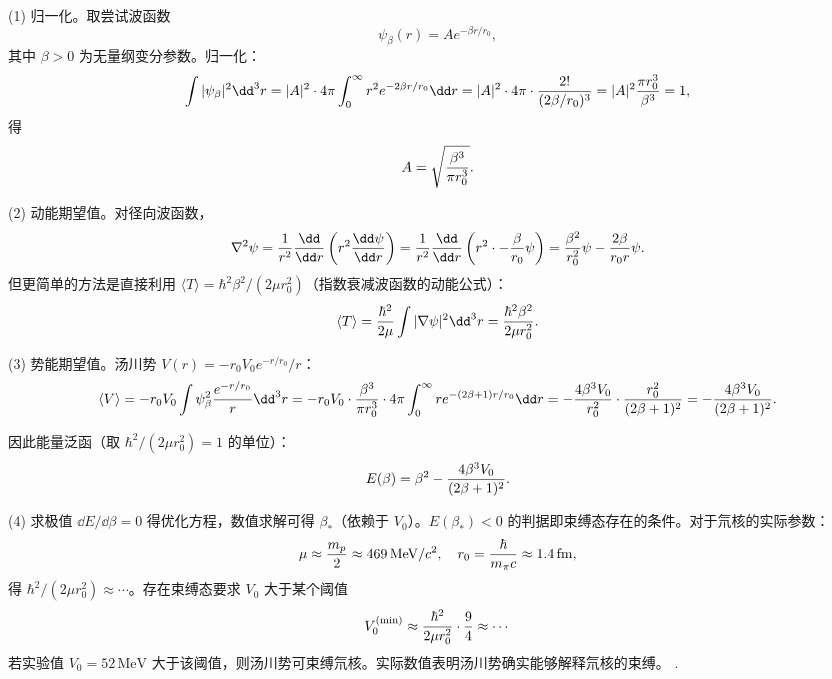\begin{solution}
(1) 归一化。取尝试波函数
\[
\psi_\beta(r)=A e^{-\beta r/r_0},
\]
其中 $\beta>0$ 为无量纲变分参数。归一化：
\[
\int|\psi_\beta|^2\dd^3r=|A|^2\cdot4\pi\int_0^\infty r^2 e^{-2\beta r/r_0}\dd r
=|A|^2\cdot4\pi\cdot{2!\over(2\beta/r_0)^3}
=|A|^2{\pi r_0^3\over\beta^3}=1,
\]
得
\[
A=\sqrt{\beta^3\over\pi r_0^3}.
\]

(2) 动能期望值。对径向波函数，
\[
\nabla^2\psi={1\over r^2}{\dd\over\dd r}\left(r^2{\dd\psi\over\dd r}\right)
={1\over r^2}{\dd\over\dd r}\left(r^2\cdot-{\beta\over r_0}\psi\right)
={\beta^2\over r_0^2}\psi-{2\beta\over r_0 r}\psi.
\]
但更简单的方法是直接利用 $\langle T\rangle=\hbar^2\beta^2/(2\mu r_0^2)$（指数衰减波函数的动能公式）：
\[
\langle T\rangle={\hbar^2\over2\mu}\int|\nabla\psi|^2\dd^3r
={\hbar^2\beta^2\over2\mu r_0^2}.
\]

(3) 势能期望值。汤川势 $V(r)=-r_0V_0 e^{-r/r_0}/r$：
\[
\langle V\rangle
=-r_0V_0\int\psi_\beta^2{e^{-r/r_0}\over r}\dd^3r
=-r_0V_0\cdot{\beta^3\over\pi r_0^3}\cdot4\pi\int_0^\infty r e^{-(2\beta+1)r/r_0}\dd r
=-{4\beta^3V_0\over r_0^2}\cdot{r_0^2\over(2\beta+1)^2}
=-{4\beta^3V_0\over(2\beta+1)^2}.
\]

因此能量泛函（取 $\hbar^2/(2\mu r_0^2)=1$ 的单位）：
\[
E(\beta)=\beta^2-{4\beta^3V_0\over(2\beta+1)^2}.
\]

(4) 求极值 $\dd E/\dd\beta=0$ 得优化方程，数值求解可得 $\beta_*$（依赖于 $V_0$）。$E(\beta_*)<0$ 的判据即束缚态存在的条件。对于氘核的实际参数：
\[
\mu\approx{m_p\over2}\approx469\,\mathrm{MeV}/c^2,\quad
r_0={\hbar\over m_\pi c}\approx1.4\,\mathrm{fm},
\]
得 $\hbar^2/(2\mu r_0^2)\approx\cdots$。存在束缚态要求 $V_0$ 大于某个阈值
\[
V_0^{\rm(min)}\approx{\hbar^2\over2\mu r_0^2}\cdot{9\over4}\approx\cdots
\]
若实验值 $V_0=52\,\mathrm{MeV}$ 大于该阈值，则汤川势可束缚氘核。实际数值表明汤川势确实能够解释氘核的束缚。
.
\end{solution}

